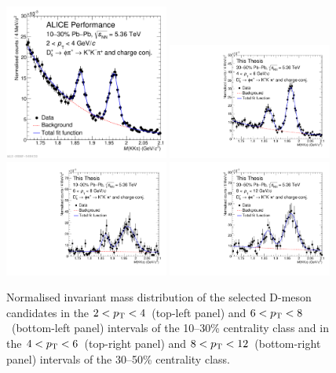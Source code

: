 \begin{figure}[htbp]
    \centering
    \includegraphics[width=0.48\textwidth]{Figures/Chapter 8/ds_massfit_norm_1030.pdf}
    \includegraphics[width=0.48\textwidth]{Figures/Chapter 8/ds_massfit_norm_3050.pdf}
    \includegraphics[width=0.48\textwidth]{Figures/Chapter 8/ds_massfit_norm_10_30_6_8.pdf}
    \includegraphics[width=0.48\textwidth]{Figures/Chapter 8/ds_massfit_norm_3050_8_12.pdf}
    \caption{Normalised invariant mass distribution of the selected D-meson candidates in the $2<p_\mathrm{T}<4$~\gevc (top-left panel) and $6<p_\mathrm{T}<8$~\gevc (bottom-left panel) intervals of the 10--30\% centrality class and in the $4<p_\mathrm{T}<6$~\gevc (top-right panel) and $8<p_\mathrm{T}<12$~\gevc (bottom-right panel) intervals of the 30--50\% centrality class.}
    \label{fig:inv_mass_fit_pbpb}
\end{figure}

